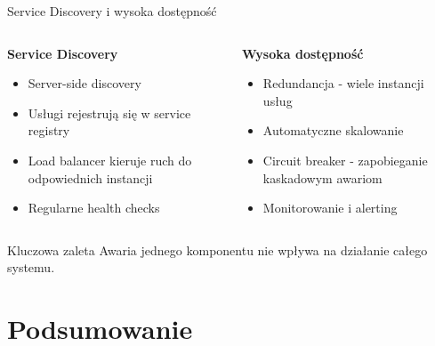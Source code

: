 \documentclass[aspectratio=169]{beamer}
\begin{document}
\begin{frame}{Service Discovery i wysoka dostępność}
    \begin{columns}
        \begin{column}{0.5\textwidth}
            \textbf{Service Discovery}
            \begin{itemize}
                \item Server-side discovery
                \item Usługi rejestrują się w service registry
                \item Load balancer kieruje ruch do odpowiednich instancji
                \item Regularne health checks
            \end{itemize}
        \end{column}
        
        \begin{column}{0.5\textwidth}
            \textbf{Wysoka dostępność}
            \begin{itemize}
                \item Redundancja - wiele instancji usług
                \item Automatyczne skalowanie
                \item Circuit breaker - zapobieganie kaskadowym awariom
                \item Monitorowanie i alerting
            \end{itemize}
        \end{column}
    \end{columns}
    
    \begin{block}{Kluczowa zaleta}
        Awaria jednego komponentu nie wpływa na działanie całego systemu.
    \end{block}
\end{frame}

\section{Podsumowanie}
\end{document}
